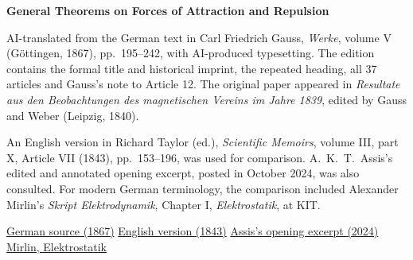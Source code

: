 \clearpage
\thispagestyle{empty}
\begin{center}\Large\textbf{General Theorems on Forces of Attraction and Repulsion}\end{center}

AI-translated from the German text in Carl Friedrich Gauss, \textit{Werke}, volume V (Göttingen, 1867), pp.~195--242, with AI-produced typesetting. The edition contains the formal title and historical imprint, the repeated heading, all 37 articles and Gauss's note to Article 12. The original paper appeared in \textit{Resultate aus den Beobachtungen des magnetischen Vereins im Jahre 1839}, edited by Gauss and Weber (Leipzig, 1840).

An English version in Richard Taylor (ed.), \textit{Scientific Memoirs}, volume III, part X, Article VII (1843), pp.~153--196, was used for comparison. A.~K.~T.~Assis's edited and annotated opening excerpt, posted in October 2024, was also consulted. For modern German terminology, the comparison included Alexander Mirlin's \textit{Skript Elektrodynamik}, Chapter I, \textit{Elektrostatik}, at KIT.

\noindent\href{https://gdz.sub.uni-goettingen.de/id/PPN236006339}{German source (1867)}\quad
\href{https://archive.org/details/scientificmemoir03memo/page/153/mode/1up}{English version (1843)}\quad
\href{https://www.ifi.unicamp.br/~assis/Gauss-1840.pdf}{Assis's opening excerpt (2024)}\quad
\href{https://www.tkm.kit.edu/downloads/ws2012_theoc/Kapitel-I-Elektrostatik.pdf}{Mirlin, Elektrostatik}
\clearpage
